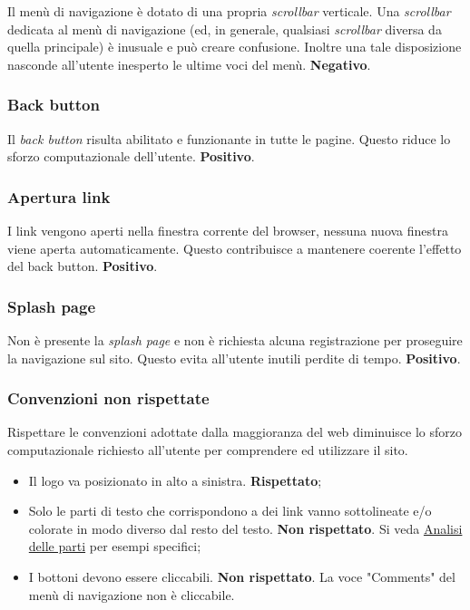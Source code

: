 \documentclass[../rapporto-usabilita.tex]{subfiles}
\begin{document}
		Il menù di navigazione è dotato di una propria \textit{scrollbar} verticale. Una \textit{scrollbar} dedicata al menù di navigazione (ed, in generale, qualsiasi \textit{scrollbar} diversa da quella principale) è inusuale e può creare confusione. Inoltre una tale disposizione nasconde all'utente inesperto le ultime voci del menù. \textbf{Negativo}.
		
		\subsubsection{Back button}
		Il \textit{back button} risulta abilitato e funzionante in 		tutte le pagine. Questo riduce lo sforzo computazionale dell'utente. \textbf{Positivo}. 
	
		\subsubsection{Apertura link}
		I link vengono aperti nella finestra corrente del browser, nessuna nuova finestra viene aperta automaticamente. Questo contribuisce a mantenere coerente l'effetto del back button. \textbf{Positivo}.
	 
	 	\subsubsection{Splash page}
	 	Non è presente la \textit{splash page} e non è richiesta alcuna registrazione per proseguire la navigazione sul sito. Questo evita all'utente inutili perdite di tempo. \textbf{Positivo}.
	 	
	 	\subsubsection{Convenzioni non rispettate}
	 	Rispettare le convenzioni adottate dalla maggioranza del web diminuisce lo sforzo computazionale richiesto all'utente per comprendere ed utilizzare il sito.
	 	
	 	\begin{itemize}
	 		\item Il logo va posizionato in alto a sinistra. \textbf{Rispettato};
	 		
	 		\item Solo le parti di testo che corrispondono a dei link vanno sottolineate e/o colorate in modo diverso dal resto del testo. \textbf{Non rispettato}. Si veda \hyperref[sec:analisiparti]{Analisi delle parti} per esempi specifici;
	 		
	 		\item I bottoni devono essere cliccabili. \textbf{Non rispettato}. La voce "Comments" del menù di navigazione non è cliccabile.
	 	\end{itemize}
	 
\end{document}
